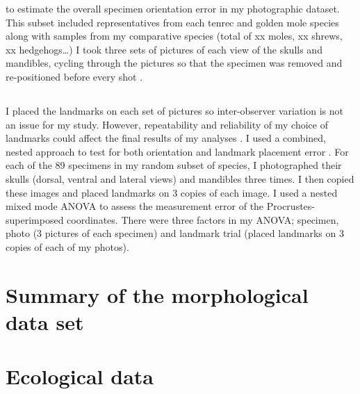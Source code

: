 to estimate the overall specimen orientation error in my photographic dataset. This subset included representatives from each tenrec and golden mole species along with samples from my comparative species (total of xx moles, xx shrews, xx hedgehogs…)  I took three sets of pictures of each view of the skulls and mandibles, cycling through the pictures so that the specimen was removed and re-positioned before every shot \citep{Viscosi2011}. 

\subsection{}

I placed the landmarks on each set of pictures so inter-observer variation is not an issue for my study.  However, repeatability and reliability of my choice of landmarks could affect the final results of my analyses \citep{Arnqvist1998}.
I used a combined, nested approach to test for both orientation and landmark placement error \citep{Arnqvist1998, Barrow2008}. For each of the 89 specimens in my random subset of species, I photographed their skulls (dorsal, ventral and lateral views) and mandibles three times. I then copied these images and placed landmarks on 3 copies of each image. I used a nested mixed mode ANOVA to assess the measurement error of the Procrustes-superimposed coordinates. There were three factors in my ANOVA; specimen, photo (3 pictures of each specimen) and landmark trial (placed landmarks on 3 copies of each of my photos).



\section{Summary of the morphological data set}

\section{Ecological data}


